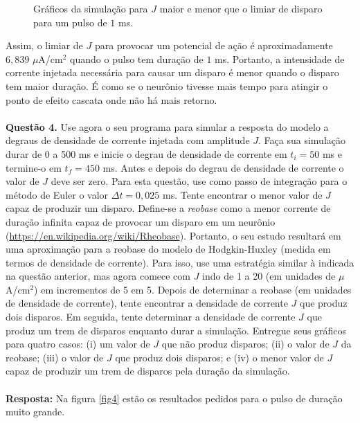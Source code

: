 \documentclass[english,11pt,a4paper]{article}
\begin{document}
\begin{figure}[H]
\begin{minipage}{0.49\textwidth}
			\captionsetup{justification=centering, labelformat=empty}
			\label{}
		\end{minipage}
		\caption{Gráficos da simulação para $J$ maior e menor que o limiar de disparo para um pulso de $1$ ms.}
		\label{fig3}
	\end{figure}
	
	Assim, o limiar de $J$ para provocar um potencial de ação é aproximadamente $6,839$ $\mu$A/cm$^2$ quando o pulso tem duração de $1$ ms. Portanto, a intensidade de corrente injetada necessária para causar um disparo é menor quando o disparo tem maior duração. É como se o neurônio tivesse mais tempo para atingir o ponto de efeito cascata onde não há mais retorno.\\\\
	

	
	
	\noindent \textbf{Questão 4.} Use agora o seu programa para simular a resposta do modelo a degraus de densidade de corrente injetada com amplitude $J$. Faça sua simulação durar de 0 a 500 ms e inicie o degrau de densidade de corrente em $t_i = 50$ ms e termine-o em $t_f = 450$ ms. Antes e depois do degrau de densidade de corrente o valor de $J$ deve ser zero. Para esta questão, use como passo de integração para o método de Euler o valor $\Delta t = 0{,}025$ ms. Tente encontrar o menor valor de $J$ capaz de produzir um disparo. Define-se a \textit{reobase} como a menor corrente de duração infinita capaz de provocar um disparo em um neurônio (\url{https://en.wikipedia.org/wiki/Rheobase}). Portanto, o seu estudo resultará em uma aproximação para a reobase do modelo de Hodgkin-Huxley (medida em termos de densidade de corrente). Para isso, use uma estratégia similar à indicada na questão anterior, mas agora comece com $J$ indo de 1 a 20 (em unidades de $\mu$A/cm$^2$) em incrementos de 5 em 5. Depois de determinar a reobase (em unidades de densidade de corrente), tente encontrar a densidade de corrente $J$ que produz dois disparos. Em seguida, tente determinar a densidade de corrente $J$ que produz um trem de disparos enquanto durar a simulação. Entregue seus gráficos para quatro casos: (i) um valor de $J$ que não produz disparos; (ii) o valor de $J$ da reobase; (iii) o valor de $J$ que produz dois disparos; e (iv) o menor valor de $J$ capaz de produzir um trem de disparos pela duração da simulação.\\\\
	
	\noindent\textbf{Resposta:} Na figura \ref{fig4} estão os resultados pedidos para o pulso de duração muito grande.
	
\end{document}
